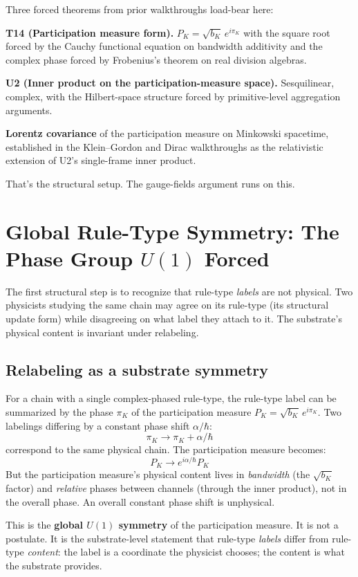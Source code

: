 \documentclass[11pt,a4paper]{article}
\begin{document}
Three forced theorems from prior walkthroughs load-bear here:

\textbf{T14 (Participation measure form).} $P_K = \sqrt{b_K}\, e^{i\pi_K}$ with the square root forced by the Cauchy functional equation on bandwidth additivity and the complex phase forced by Frobenius's theorem on real division algebras.

\textbf{U2 (Inner product on the participation-measure space).} Sesquilinear, complex, with the Hilbert-space structure forced by primitive-level aggregation arguments.

\textbf{Lorentz covariance} of the participation measure on Minkowski spacetime, established in the Klein--Gordon and Dirac walkthroughs as the relativistic extension of U2's single-frame inner product.

That's the structural setup. The gauge-fields argument runs on this.

\section{Global Rule-Type Symmetry: The Phase Group $U(1)$ Forced}

The first structural step is to recognize that rule-type \emph{labels} are not physical. Two physicists studying the same chain may agree on its rule-type (its structural update form) while disagreeing on what label they attach to it. The substrate's physical content is invariant under relabeling.

\subsection{Relabeling as a substrate symmetry}

For a chain with a single complex-phased rule-type, the rule-type label can be summarized by the phase $\pi_K$ of the participation measure $P_K = \sqrt{b_K}\, e^{i\pi_K}$. Two labelings differing by a constant phase shift $\alpha/\hbar$:
\[
\pi_K \to \pi_K + \alpha/\hbar
\]
correspond to the same physical chain. The participation measure becomes:
\[
P_K \to e^{i\alpha/\hbar} P_K
\]
But the participation measure's physical content lives in \emph{bandwidth} (the $\sqrt{b_K}$ factor) and \emph{relative} phases between channels (through the inner product), not in the overall phase. An overall constant phase shift is unphysical.

This is the \textbf{global $U(1)$ symmetry} of the participation measure. It is not a postulate. It is the substrate-level statement that rule-type \emph{labels} differ from rule-type \emph{content}: the label is a coordinate the physicist chooses; the content is what the substrate provides.
\end{document}

